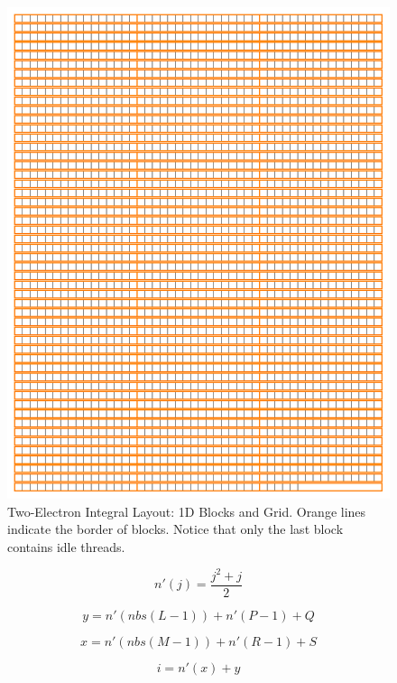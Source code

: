 \documentclass[12pt]{report}
\begin{document}
\begin{figure}[h!]
\includegraphics[width=1\textwidth]{Figures/gen_vec_block_layout.png}
\caption[Two-Electron Integral Layout: 1D Blocks and Grid]
{Two-Electron Integral Layout: 1D Blocks and Grid. Orange lines indicate the border of blocks. Notice that only the last block contains idle threads.}
\label{fig:genvecblock}
\end{figure}

\begin{equation}
\label{nprime}
n'(j) = \frac{j^{2}+j}{2}
\end{equation}

\begin{equation}
\label{ylpq}
y = n'(nbs(L - 1)) + n'(P - 1) + Q
\end{equation}

\begin{equation}
\label{xmrs}
x = n'(nbs(M - 1)) + n'(R - 1) + S
\end{equation}

\begin{equation}
\label{numtothread}
i = n'(x) + y
\end{equation}
\end{document}
